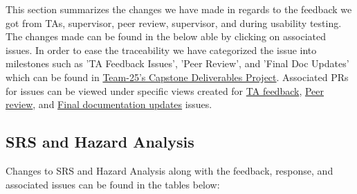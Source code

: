 \documentclass{article}
\begin{document}

This section summarizes the changes we have made in regards to the feedback we got from TAs, supervisor, peer review, supervisor, and during usability testing. 
The changes made can be found in the below able by clicking on associated issues. 
In order to ease the traceability we have categorized the issue into milestones such as 'TA Feedback Issues', 'Peer Review', and 'Final Doc Updates' which can be found in \href{https://github.com/users/Inreet-Kaur/projects/2/views/1}{Team-25's Capstone Deliverables Project}. Associated PRs for issues can be viewed under specific views created for \href{https://github.com/users/Inreet-Kaur/projects/2/views/8?sliceBy%5Bvalue%5D=TA+Feedback+Issues}{TA feedback},  \href{https://github.com/users/Inreet-Kaur/projects/2/views/10?sliceBy%5Bvalue%5D=Peer+Review}{Peer review}, and \href{https://github.com/users/Inreet-Kaur/projects/2/views/9?sliceBy%5Bvalue%5D=Milestone+8+-+Final+Doc+Updates}{Final documentation updates} issues.

\subsection{SRS and Hazard Analysis}

Changes to SRS and Hazard Analysis along with the feedback, response, and associated issues can be found in the tables below: 
\end{document}
